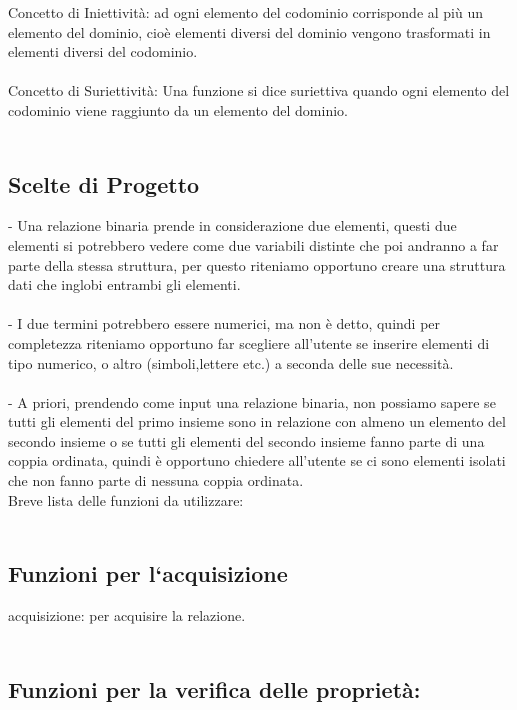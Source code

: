 \documentclass[11pt, a4paper, titlepage, block]{article}
\begin{document}
Concetto di Iniettivit\`a: ad ogni elemento del codominio corrisponde al pi\`u
un elemento del dominio, cio\`e elementi diversi del dominio
vengono trasformati in elementi diversi del codominio.\\
\\
Concetto di Suriettivit\`a: Una funzione si dice suriettiva quando ogni elemento del codominio viene raggiunto da un elemento del dominio.\\
\\
\newpage
\subsection{Scelte di Progetto}

- Una relazione binaria prende in considerazione due elementi, questi due elementi si potrebbero vedere come due variabili distinte che poi andranno a far parte della stessa struttura, per questo riteniamo opportuno creare una struttura dati che inglobi entrambi gli elementi.\\
\\
- I due termini potrebbero essere numerici, ma non \`e detto, quindi per completezza riteniamo opportuno far scegliere all'utente se inserire elementi di tipo numerico, o altro  (simboli,lettere etc.)  a seconda delle sue necessit\`a.\\
\\
- A priori, prendendo come input una relazione binaria, non possiamo sapere se tutti gli elementi del primo insieme sono in relazione con almeno un elemento del secondo insieme o se tutti gli elementi del secondo insieme fanno parte di una coppia ordinata, quindi \`e opportuno chiedere all'utente se ci sono elementi isolati che non fanno parte di nessuna coppia ordinata.\\  
\newpage
Breve lista delle funzioni da utilizzare:\\
\\
	\subsection{Funzioni per l`acquisizione}
	
	acquisizione:  per acquisire la relazione.\\
	\\
	
	\subsection{Funzioni per la verifica delle propriet\`a:}
\end{document}
